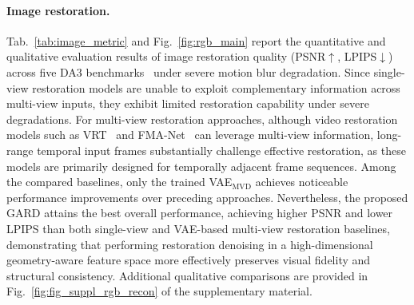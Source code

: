 \paragraph{Image restoration.}
Tab.~\ref{tab:image_metric} and Fig.~\ref{fig:rgb_main} report the quantitative and qualitative evaluation results of image restoration quality (PSNR$\uparrow$, LPIPS$\downarrow$) across five DA3 benchmarks~\cite{depthanything3} under severe motion blur degradation. Since single-view restoration models are unable to exploit complementary information across multi-view inputs, they exhibit limited restoration capability under severe degradations. For multi-view restoration approaches, although video restoration models such as VRT~\cite{liang2024vrt} and FMA-Net~\cite{Youk_2024_CVPR} can leverage multi-view information, long-range temporal input frames substantially challenge effective restoration, as these models are primarily designed for temporally adjacent frame sequences. Among the compared baselines, only the trained VAE$_\text{MVD}$ achieves noticeable performance improvements over preceding approaches. Nevertheless, the proposed GARD attains the best overall performance, achieving higher PSNR and lower LPIPS than both single-view and VAE-based multi-view restoration baselines, demonstrating that performing restoration denoising in a high-dimensional geometry-aware feature space more effectively preserves visual fidelity and structural consistency. Additional qualitative comparisons are provided in Fig.~\ref{fig:fig_suppl_rgb_recon} of the supplementary material.






